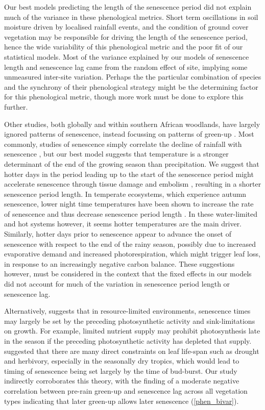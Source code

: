 \documentclass[11pt,a4paper]{article}
\begin{document}
Our best models predicting the length of the senescence period did not explain
much of the variance in these phenological metrics. Short term oscillations in
soil moisture driven by localised rainfall events, and the condition of ground
cover vegetation may be responsible for driving the length of the senescence
period, hence the wide variability of this phenological metric and the poor fit
of our statistical models. Most of the variance explained by our models of
senescence length and senescence lag came from the random effect of site,
implying some unmeasured inter-site variation. Perhaps the the particular
combination of species and the synchrony of their phenological strategy might
be the determining factor for this phenological metric, though more work must
be done to explore this further.

Other studies, both globally and within southern African woodlands, have
largely ignored patterns of senescence, instead focussing on patterns of
green-up \citep{Gallinat2015}. Most commonly, studies of senescence simply correlate
the decline of rainfall with senescence \citep{Stevens2016, Guan2014}, but our
best model suggests that temperature is a stronger determinant of the end of
the growing season than precipitation. We suggest that hotter days in the
period leading up to the start of the senescence period might accelerate
senescence through tissue damage and embolism \citep{Cho2017}, resulting in a
shorter senescence period length. In temperate ecosystems, which experience
autumn senescence, lower night time temperatures have been shown to increase
the rate of senescence and thus decrease senescence period length
\citep{Michelson2017, Escamilla2020}. In these water-limited and hot systems
however, it seems hotter temperatures are the main driver. Similarly, hotter
days prior to senescence appear to advance the onset of senescence with respect
to the end of the rainy season, possibly due to increased evaporative demand
and increased photorespiration, which might trigger leaf loss, in response to
an increasingly negative carbon balance. These suggestions however, must be
considered in the context that the fixed effects in our models did not account
for much of the variation in senescence period length or senescence lag.

Alternatively, \citet{Zani2020} suggests that in resource-limited environments,
senescence times may largely be set by the preceding photosynthetic activity
and sink-limitations on growth. For example, limited nutrient supply may
prohibit photosynthesis late in the season if the preceding photosynthetic
activity has depleted that supply. \citet{Reich1992} suggested that there are
many direct constraints on leaf life-span such as drought and herbivory,
especially in the seasonally dry tropics, which would lead to timing of
senescence being set largely by the time of bud-burst. Our study indirectly
corroborates this theory, with the finding of a moderate negative correlation
between pre-rain green-up and senescence lag across all vegetation types
indicating that later green-up allows later senescence (\autoref{phen_bivar}).
\end{document}
